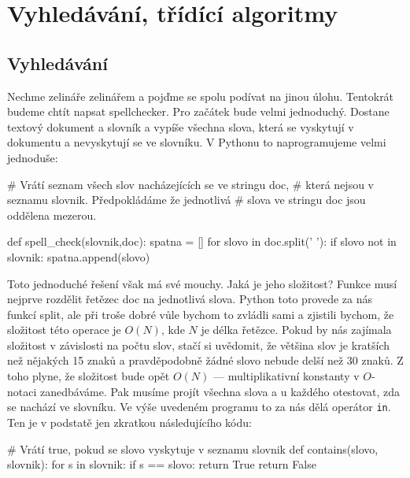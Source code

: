\ifx\ucebnice\undefined

\fi
\section{Vyhledávání, třídící algoritmy}

\subsection*{Vyhledávání} 
Nechme zelináře zelinářem a pojďme se spolu podívat na jinou úlohu. Tentokrát budeme chtít napsat spellchecker. Pro začátek bude
velmi jednoduchý. Dostane textový dokument a slovník a vypíše všechna slova, která se vyskytují v dokumentu a nevyskytují se
ve slovníku. V Pythonu to naprogramujeme velmi jednoduše:

\begin{python}
# Vrátí seznam všech slov nacházejících se ve stringu doc,
# která nejsou v seznamu slovnik. Předpokládáme že jednotlivá
# slova ve stringu doc jsou oddělena mezerou.

def spell_check(slovnik,doc):  
  spatna = []  
  for slovo in doc.split(' '):
    if slovo not in slovnik:
      spatna.append(slovo)
\end{python}

Toto jednoduché řešení však má své mouchy. Jaká je jeho složitost? Funkce musí nejprve rozdělit řetězec doc na jednotlivá slova.
Python toto provede za nás funkcí split, ale při troše dobré vůle bychom to zvládli sami a zjistili bychom, že složitost této
operace je $O(N)$, kde $N$ je délka řetězce. Pokud by nás zajímala složitost v závislosti na počtu slov, stačí si uvědomit, že
většina slov je kratších než nějakých 15 znaků a pravděpodobně žádné slovo nebude delší než 30 znaků. Z toho plyne, že složitost
bude opět $O(N)$ --- multiplikativní konstanty v $O$-notaci zanedbáváme. Pak musíme projít všechna slova a u každého otestovat,
zda se nachází ve slovníku. Ve výše uvedeném programu to za nás dělá operátor {\tt in}. Ten je v podstatě jen zkratkou
následujícího kódu:

\begin{python}
# Vrátí true, pokud se slovo vyskytuje v seznamu slovnik
def contains(slovo, slovnik):
  for s in slovnik:
    if s == slovo:
      return True
  return False
\end{python}

